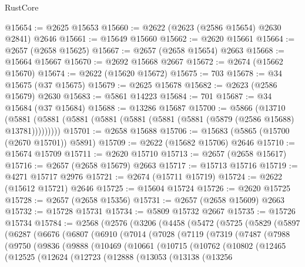\begin{lexlean}{RustCore}
\begin{coremodule}
@15654 := @2625 @15653
@15660 := @2622 (@2623 (@2586 @15654) @2630 @2841) @2646
@15661 := @15649 @15660
@15662 := @2620 @15661
@15664 := @2657 (@2658 @15625)
@15667 := @2657 (@2658 @15654) @2663
@15668 := @15664 @15667
@15670 := @2692 @15668 @2667
@15672 := @2674 (@15662 @15670)
@15674 := @2622 (@15620 @15672)
@15675 := 703
@15678 := @34 @15675 (@37 @15675)
@15679 := @2625 @15678
@15682 := @2623 (@2586 @15679) @2630
@15683 := @5861 @14223
@15684 := 701
@15687 := @34 @15684 (@37 @15684)
@15688 := @13286 @15687
@15700 := @5866
    (@13710 (@5881 (@5881 (@5881 (@5881 (@5881 (@5881 (@5881 (@5879 (@2586 @15688) @13781)))))))))
@15701 := @2658 @15688
@15706 := @15683 (@5865 (@15700 (@2670 @15701)) @5891)
@15709 := @2622 (@15682 @15706) @2646
@15710 := @15674 @15709
@15711 := @2620 @15710
@15713 := @2657 (@2658 @15617)
@15716 := @2657 (@2658 @15679) @2663
@15717 := @15713 @15716
@15719 := @4271 @15717 @2976
@15721 := @2674 (@15711 @15719)
@15724 := @2622 (@15612 @15721) @2646
@15725 := @15604 @15724
@15726 := @2620 @15725
@15728 := @2657 (@2658 @15356)
@15731 := @2657 (@2658 @15609) @2663
@15732 := @15728 @15731
@15734 := @5809 @15732 @2667
@15735 := @15726 @15734
@15784 := @2568
    (@2576
      (@3206
        (@4458
          (@5472
            (@5725
              (@5829
                (@5897
                  (@6287
                    (@6676
                      (@6807
                        (@6910
                          (@7014
                            (@7028
                              (@7119
                                (@7319
                                  (@7487
                                    (@7988
                                      (@9750
                                        (@9836
                                          (@9888
                                            (@10469
                                              (@10661
                                                (@10715
                                                  (@10762
                                                    (@10802
                                                      (@12465
                                                        (@12525
                                                          (@12624
                                                            (@12723
                                                              (@12888
                                                                (@13053
                                                                  (@13138
                                                                    (@13256

\end{coremodule}
\end{lexlean}
